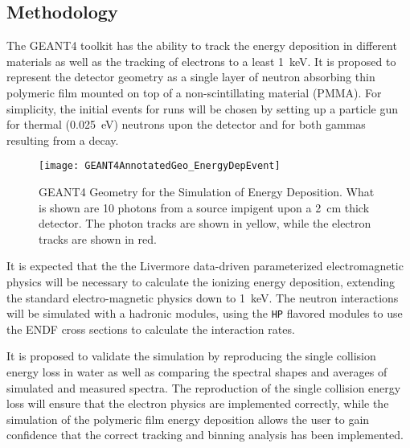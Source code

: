 \subsection{Methodology}

The GEANT4 toolkit has the ability to track the energy deposition in different materials as well as the tracking of electrons to a least \SI{1}{\keV}\cite{agostinelli_geant4simulation_2003}.
It is proposed to represent the detector geometry as a single layer of neutron absorbing thin polymeric film mounted on top of a non-scintillating material (PMMA).
For simplicity, the initial events for runs will be chosen by setting up a particle gun for thermal (\SI{0.025}{\eV}) neutrons upon the detector and for both gammas resulting from a  decay.
\begin{figure}
  \texttt{[image: GEANT4AnnotatedGeo\_EnergyDepEvent]}
	\caption[GEANT4 Energy Depostion Geometry]{GEANT4 Geometry for the Simulation of Energy Deposition. What is shown are 10 photons from a  source impigent upon a \SI{2}{\cm} thick detector.  The photon tracks are shown in yellow, while the electron tracks are shown in red.}
	\label{fig:EDepSimGeo}
\end{figure}
It is expected that the the Livermore data-driven parameterized electromagnetic physics will be necessary to calculate the ionizing energy deposition, extending the standard electro-magnetic physics down to \SI{1}{\kilo\eV}.
The neutron interactions will be simulated with a hadronic modules, using the \verb+HP+ flavored modules to use the ENDF cross sections to calculate the interaction rates.

It is proposed to validate the simulation by reproducing the single collision energy loss in water as well as comparing  the spectral shapes and averages of simulated and measured spectra.
The reproduction of the single collision energy loss will ensure that the electron physics are implemented correctly, while the simulation of the polymeric film energy deposition allows the user to gain confidence that the correct tracking and binning analysis has been implemented.



